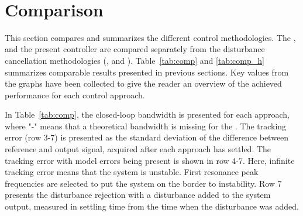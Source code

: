 \newpage~\newpage
\FloatBarrier
\section{Comparison}\label{sec:comparison}
This section compares and summarizes the different control methodologies. The \abbrIRC, \abbrMRACPE and the present controller are compared separately from the disturbance cancellation methodologies (\abbrFDC, \abbrRFDC and \abbrIMP). Table~\ref{tab:comp} and \ref{tab:comp_h} summarizes comparable results presented in previous sections. Key values from the graphs have been collected to give the reader an overview of the achieved performance for each control approach.

In Table~\ref{tab:comp}, the closed-loop bandwidth is presented for each approach, where "-" means that a theoretical bandwidth is missing for the \abbrMRACPE. The tracking error (row 3-7) is presented as the standard deviation of the difference between reference and output signal, acquired after each approach has settled. The tracking error with model errors being present is shown in row 4-7. Here, infinite tracking error means that the system is unstable. First resonance peak frequencies are selected to put the system on the border to instability. Row 7 presents the disturbance rejection with a disturbance added to the system output, measured in settling time from the time when the disturbance was added.

